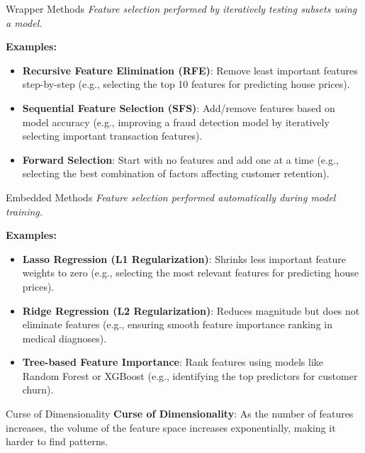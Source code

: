 \documentclass{beamer}
\begin{document}
\begin{frame}{Wrapper Methods}
    \textit{Feature selection performed by iteratively testing subsets using a model.}

    \textbf{Examples:}  
    \begin{itemize}
        \item \textbf{Recursive Feature Elimination (RFE)}: Remove least important features step-by-step (e.g., selecting the top 10 features for predicting house prices).
        \item \textbf{Sequential Feature Selection (SFS)}: Add/remove features based on model accuracy (e.g., improving a fraud detection model by iteratively selecting important transaction features).
        \item \textbf{Forward Selection}: Start with no features and add one at a time (e.g., selecting the best combination of factors affecting customer retention).
    \end{itemize}
\end{frame}

\begin{frame}{Embedded Methods}
    \textit{Feature selection performed automatically during model training.}

    \textbf{Examples:}  
    \begin{itemize}
        \item \textbf{Lasso Regression (L1 Regularization)}: Shrinks less important feature weights to zero (e.g., selecting the most relevant features for predicting house prices).
        \item \textbf{Ridge Regression (L2 Regularization)}: Reduces magnitude but does not eliminate features (e.g., ensuring smooth feature importance ranking in medical diagnoses).
        \item \textbf{Tree-based Feature Importance}: Rank features using models like Random Forest or XGBoost (e.g., identifying the top predictors for customer churn).
    \end{itemize}
\end{frame}

\begin{frame}{Curse of Dimensionality}
  \textbf{Curse of Dimensionality}: As the number of features increases, the volume of the feature space increases exponentially, making it harder to find patterns.\\
\end{frame}
\end{document}
